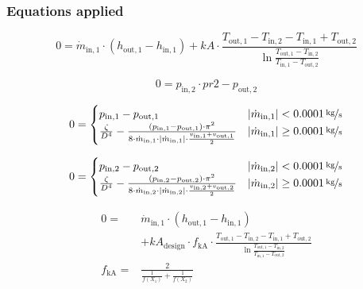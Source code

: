 \subsubsection{Equations applied}

\begin{equation}
\label{eq:HeatExchanger_kA}
0 = \dot{m}_\mathrm{in,1} \cdot \left( h_\mathrm{out,1} - h_\mathrm{in,1}\right)+ kA \cdot \frac{T_\mathrm{out,1} - T_\mathrm{in,2} - T_\mathrm{in,1} + T_\mathrm{out,2}}{\ln{\frac{T_\mathrm{out,1} - T_\mathrm{in,2}}{T_\mathrm{in,1} - T_\mathrm{out,2}}}}
\end{equation}

\begin{equation}
\label{eq:HeatExchanger_pr2}
0=p_\mathrm{in,2}\cdot pr2 - p_\mathrm{out,2}
\end{equation}

\begin{equation}
\label{eq:HeatExchanger_zeta1}
0 = \begin{cases}
p_\mathrm{in,1}- p_\mathrm{out,1} & |\dot{m}_\mathrm{in,1}| < \unitfrac[0.0001]{kg}{s} \\
\frac{\zeta}{D^4}-\frac{(p_\mathrm{in,1}-p_\mathrm{out,1})\cdot\pi^2}{8\cdot\dot{m}_\mathrm{in,1}\cdot|\dot{m}_\mathrm{in,1}|\cdot\frac{v_\mathrm{in,1} + v_\mathrm{out,1}}{2}}& |\dot{m}_\mathrm{in,1}| \geq \unitfrac[0.0001]{kg}{s}
\end{cases}
\end{equation}

\begin{equation}
\label{eq:HeatExchanger_zeta2}
0 = \begin{cases}
p_\mathrm{in,2}- p_\mathrm{out,2} & |\dot{m}_\mathrm{in,2}| < \unitfrac[0.0001]{kg}{s} \\
\frac{\zeta}{D^4}-\frac{(p_\mathrm{in,2}-p_\mathrm{out,2})\cdot\pi^2}{8\cdot\dot{m}_\mathrm{in,2}\cdot|\dot{m}_\mathrm{in,2}|\cdot\frac{v_\mathrm{in,2} + v_\mathrm{out,2}}{2}}& |\dot{m}_\mathrm{in,2}| \geq \unitfrac[0.0001]{kg}{s}
\end{cases}
\end{equation}

\begin{equation}
\label{eq:HeatExchanger_kA_char}
\begin{split}
0 = & \dot{m}_\mathrm{in,1} \cdot \left( h_\mathrm{out,1} - h_\mathrm{in,1}\right)\\
&+kA_\mathrm{design} \cdot f_\mathrm{kA} \cdot \frac{T_\mathrm{out,1} - T_\mathrm{in,2} - T_\mathrm{in,1} + T_\mathrm{out,2}}{\ln{\frac{T_\mathrm{out,1} - T_\mathrm{in,2}}{T_\mathrm{in,1} - T_\mathrm{out,2}}}}\\
f_\mathrm{kA}=&\frac{2}{\frac{1}{f\left(X_1\right)}+\frac{1}{f\left(X_2\right)}}\\
\end{split}
\end{equation}

